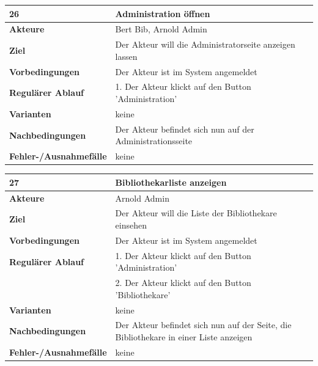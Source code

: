 \documentclass[fontsize=12pt,paper=a4,twoside]{scrartcl}
\begin{document}
\begin{table}[htbp]
\label{26}
\begin{tabular}{|l|p{10cm}|}
\hline 
\textbf{26} & \textbf{Administration öffnen} \\ \hline
\textbf{Akteure} & Bert Bib, Arnold Admin\\ \hline
\textbf{Ziel} & Der Akteur will die Administratorseite anzeigen lassen \\ \hline
\textbf{Vorbedingungen} & Der Akteur ist im System angemeldet \\ \hline
\textbf{Regulärer Ablauf} & 
1. Der Akteur klickt auf den Button 'Administration' \\
\hline
\textbf{Varianten} & 
keine \\ \hline
\textbf{Nachbedingungen} & Der Akteur befindet sich nun auf der Administrationsseite\\ \hline
\textbf{Fehler-/Ausnahmefälle} & keine\\
\hline
\end{tabular}
\end{table}

\newpage

\begin{table}[htbp]
\label{27}
\begin{tabular}{|l|p{10cm}|}
\hline 
\textbf{27} & \textbf{Bibliothekarliste anzeigen} \\ \hline
\textbf{Akteure} & Arnold Admin\\ \hline
\textbf{Ziel} & Der Akteur will die Liste der Bibliothekare einsehen \\ \hline
\textbf{Vorbedingungen} & Der Akteur ist im System angemeldet \\ \hline
\textbf{Regulärer Ablauf} & 
1. Der Akteur klickt auf den Button 'Administration' \\
&2. Der Akteur klickt auf den Button 'Bibliothekare'\\
\hline
\textbf{Varianten} & 
keine \\ \hline
\textbf{Nachbedingungen} & Der Akteur befindet sich nun auf der Seite, die Bibliothekare in einer Liste anzeigen\\ \hline
\textbf{Fehler-/Ausnahmefälle} & keine\\
\hline
\end{tabular}
\end{table}
\end{document}
